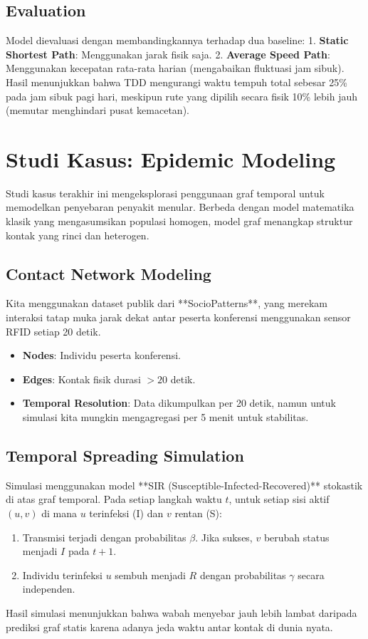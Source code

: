 \documentclass[12pt,a4paper]{book}
\begin{document}
\section{Evaluation}
Model dievaluasi dengan membandingkannya terhadap dua baseline:
1.  \textbf{Static Shortest Path}: Menggunakan jarak fisik saja.
2.  \textbf{Average Speed Path}: Menggunakan kecepatan rata-rata harian (mengabaikan fluktuasi jam sibuk).
Hasil menunjukkan bahwa TDD mengurangi waktu tempuh total sebesar 25\% pada jam sibuk pagi hari, meskipun rute yang dipilih secara fisik 10\% lebih jauh (memutar menghindari pusat kemacetan).

\chapter{Studi Kasus: Epidemic Modeling}
Studi kasus terakhir ini mengeksplorasi penggunaan graf temporal untuk memodelkan penyebaran penyakit menular. Berbeda dengan model matematika klasik yang mengasumsikan populasi homogen, model graf menangkap struktur kontak yang rinci dan heterogen.

\section{Contact Network Modeling}
Kita menggunakan dataset publik dari **SocioPatterns**, yang merekam interaksi tatap muka jarak dekat antar peserta konferensi menggunakan sensor RFID setiap 20 detik.
\begin{itemize}
    \item \textbf{Nodes}: Individu peserta konferensi.
    \item \textbf{Edges}: Kontak fisik durasi $>20$ detik.
    \item \textbf{Temporal Resolution}: Data dikumpulkan per 20 detik, namun untuk simulasi kita mungkin mengagregasi per 5 menit untuk stabilitas.
\end{itemize}

\section{Temporal Spreading Simulation}
Simulasi menggunakan model **SIR (Susceptible-Infected-Recovered)** stokastik di atas graf temporal.
Pada setiap langkah waktu $t$, untuk setiap sisi aktif $(u, v)$ di mana $u$ terinfeksi (I) dan $v$ rentan (S):
\begin{enumerate}
    \item Transmisi terjadi dengan probabilitas $\beta$. Jika sukses, $v$ berubah status menjadi $I$ pada $t+1$.
    \item Individu terinfeksi $u$ sembuh menjadi $R$ dengan probabilitas $\gamma$ secara independen.
\end{enumerate}
Hasil simulasi menunjukkan bahwa wabah menyebar jauh lebih lambat daripada prediksi graf statis karena adanya jeda waktu antar kontak di dunia nyata.
\end{document}
